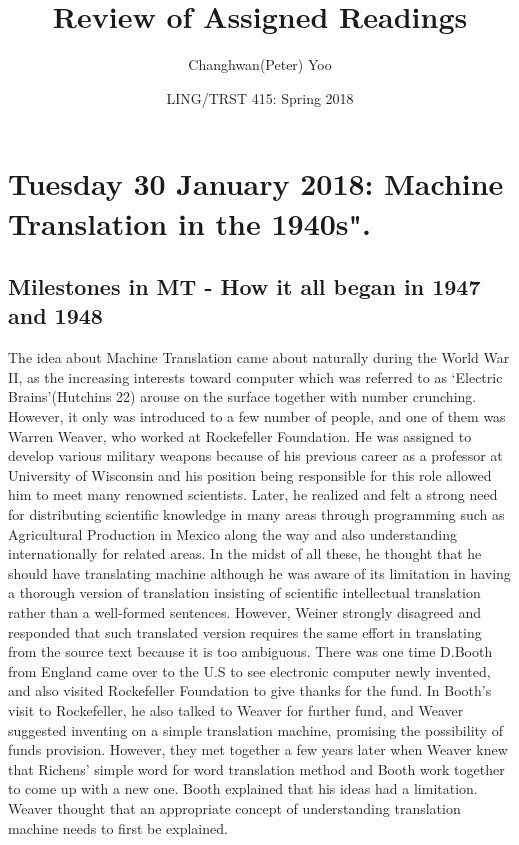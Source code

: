 \documentclass{report}
\title{Review of Assigned Readings}
\author{Changhwan(Peter) Yoo}
\date{LING/TRST 415: Spring 2018}
\begin{document}
\renewcommand{\chaptername}{Day}
\maketitle
\tableofcontents

\chapter{Tuesday 30 January 2018: Machine Translation in the 1940s".}
\section{Milestones in MT - How it all began in 1947 and 1948}
 The idea about Machine Translation came about naturally during the World War II, as the increasing interests toward computer which was referred to as ‘Electric Brains’(Hutchins 22) arouse on the surface together with number crunching. However, it only was introduced to a few number of people, and one of them was Warren Weaver, who worked at Rockefeller Foundation. He was assigned to develop various military weapons because of his previous career as a professor at University of Wisconsin and his position being responsible for this role allowed him to meet many renowned scientists. Later, he realized and felt a strong need for distributing scientific knowledge in many areas through programming such as Agricultural Production in Mexico along the way and also understanding internationally for related areas. In the midst of all these, he thought that he should have translating machine although he was aware of its limitation in having a thorough version of translation insisting of scientific intellectual translation rather than a well-formed sentences. However, Weiner strongly disagreed and responded that such translated version requires the same effort in translating from the source text because it is too ambiguous. There was one time D.Booth from England came over to the U.S to see electronic computer newly invented, and also visited Rockefeller Foundation to give thanks for the fund. In Booth’s visit to Rockefeller, he also talked to Weaver for further fund, and Weaver suggested inventing on a simple translation machine, promising the possibility of funds provision. However, they met together a few years later when Weaver knew that Richens’ simple word for word translation method and Booth work together to come up with a new one. Booth explained that his ideas had a limitation. Weaver thought that an appropriate concept of understanding translation machine needs to first be explained.
 
\end{document}
